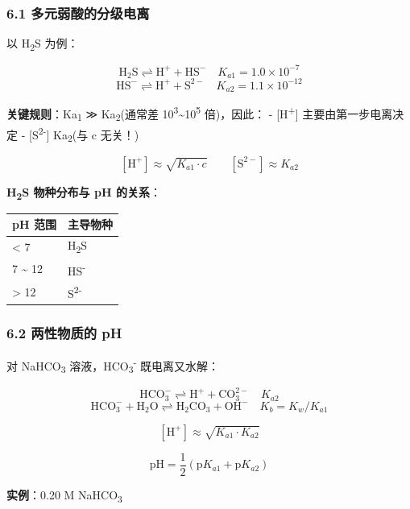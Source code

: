 \subsubsection{6.1 多元弱酸的分级电离}\label{ux591aux5143ux5f31ux9178ux7684ux5206ux7ea7ux7535ux79bb}

以 H\textsubscript{2}S 为例：

\[
\mathrm{H_2S \rightleftharpoons H^+ + HS^-} \quad K_{a1} = 1.0 \times 10^{-7}
\]
\[
\mathrm{HS^- \rightleftharpoons H^+ + S^{2-}} \quad K_{a2} = 1.1 \times 10^{-12}
\]

\textbf{关键规则}：Ka\textsubscript{1} ≫ Ka\textsubscript{2}(通常差 10\textsuperscript{3}\textasciitilde10\textsuperscript{5} 倍)，因此：
- {[}H\textsuperscript{+}{]} 主要由第一步电离决定
- {[}S\textsuperscript{2-}{]}  Ka\textsubscript{2}(与 c 无关！)

\[
[\mathrm{H^+}] \approx \sqrt{K_{a1} \cdot c} \qquad [\mathrm{S^{2-}}] \approx K_{a2}
\]

\textbf{H\textsubscript{2}S 物种分布与 pH 的关系}：

{\def\LTcaptype{none} %
\begin{longtable}[]{@{}ll@{}}
\toprule\noalign{}
pH 范围 & 主导物种 \\
\midrule\noalign{}
\endhead
\bottomrule\noalign{}
\endlastfoot
\textless{} 7 & H\textsubscript{2}S \\
7 \textasciitilde{} 12 & HS\textsuperscript{-} \\
\textgreater{} 12 & S\textsuperscript{2-} \\
\end{longtable}
}

\subsubsection{6.2 两性物质的 pH}\label{ux4e24ux6027ux7269ux8d28ux7684-ph}

对 NaHCO\textsubscript{3} 溶液，HCO\textsubscript{3}\textsuperscript{-} 既电离又水解：

\[
\mathrm{HCO_3^- \rightleftharpoons H^+ + CO_3^{2-}} \quad K_{a2}
\]
\[
\mathrm{HCO_3^- + H_2O \rightleftharpoons H_2CO_3 + OH^-} \quad K_b = K_w/K_{a1}
\]

\[
\boxed{[\mathrm{H^+}] \approx \sqrt{K_{a1} \cdot K_{a2}}}
\]

\[
\boxed{\mathrm{pH} = \frac{1}{2}(\mathrm{p}K_{a1} + \mathrm{p}K_{a2})}
\]

\textbf{实例}：0.20 M NaHCO\textsubscript{3}

